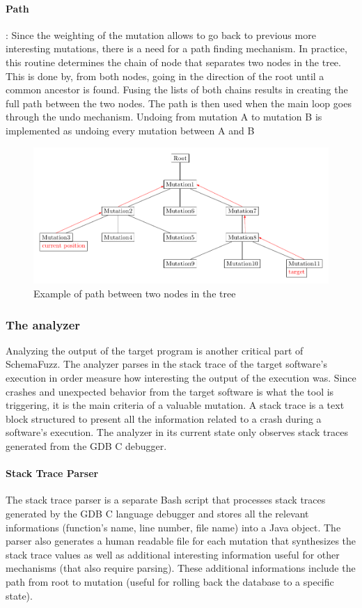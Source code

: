 \documentclass{article}
\begin{document}
\begin{empfile}
				\paragraph{Path}:
Since the weighting of the mutation allows to go back to previous more interesting mutations, there is a need for a path finding mechanism. In practice, this routine determines the chain of node that separates two nodes in the tree. This is done by, from both nodes, going in the direction of the root until a common ancestor is found. Fusing the lists of both chains results in creating the full path between the two nodes. The path is then used when the main loop goes through the undo mechanism. Undoing from mutation A to mutation B is implemented as undoing every mutation between A and B

\bigskip

\begin{figure}[h!] 
\centering
\includegraphics[width=\textwidth]{CommonAncestorDiagram.pdf}
\caption{Example of path between two nodes in the tree}
\end{figure}

\bigskip
			\subsubsection{The analyzer}
Analyzing the output of the target program is another critical part of SchemaFuzz. The analyzer parses in the stack trace of the target software's execution in order measure how interesting the output of the execution was. Since crashes and unexpected behavior from the target software is what the tool is triggering, it is the main criteria of a valuable mutation. A stack trace is a text block structured to present all the information related to a crash during a software's execution. The analyzer in its current state only observes stack traces generated from the GDB C debugger.  
				\paragraph{Stack Trace Parser}
The stack trace parser is a separate Bash script that processes stack traces generated by the GDB C language debugger and stores all the relevant informations (function's name, line number, file name) into a Java object. The parser also generates a human readable file for each mutation that synthesizes the stack trace values as well as additional interesting information useful for other mechanisms (that also require parsing). These additional informations include the path from root to mutation (useful for rolling back the database to a specific state).

\end{empfile}
\end{document}
